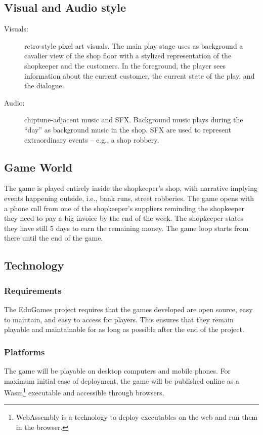 \documentclass[a4paper,11pt]{article}
\begin{document}
\subsection{Visual and Audio style}\label{visual-and-audio-style}
\begin{description}
  \item[Visuals:] retro-style pixel art visuals. The main play stage uses as background a cavalier view of the shop floor with a stylized representation of the shopkeeper and the customers. In the foreground, the player sees information about the current customer, the current state of the play, and the dialogue.
  \item[Audio:] chiptune-adjacent music and SFX. Background music plays during the ``day'' as background music in the shop. SFX are used to represent extraordinary events -- e.g., a shop robbery.
\end{description}

\subsection{Game World}\label{game-world}
The game is played entirely inside the shopkeeper's shop, with narrative implying events happening outside, i.e., bank runs, street robberies. The game opens with a phone call from one of the shopkeeper's suppliers reminding the shopkeeper they need to pay a big invoice by the end of the week. The shopkeeper states they have still 5 days to earn the remaining money. The game loop starts from there until the end of the game.

\subsection{Technology}\label{technology}
\subsubsection{Requirements}\label{technology-requirements}
The EduGames project requires that the games developed are open source, easy to maintain, and easy to access for players. This ensures that they remain playable and maintainable for as long as possible after the end of the project.

\subsubsection{Platforms}
The game will be playable on desktop computers and mobile phones. For maximum initial ease of deployment, the game will be published online as a Wasm\footnote{WebAssembly is a technology to deploy executables on the web and run them in the browser.} executable and accessible through browsers.
\end{document}
